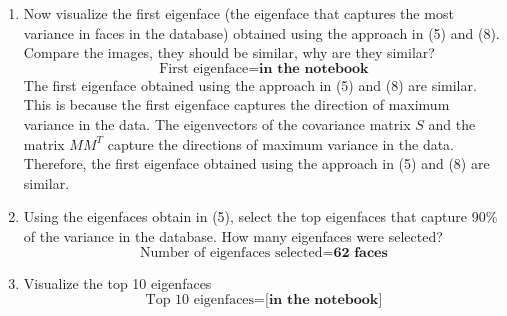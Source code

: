 \documentclass[12pt]{extarticle} %
\begin{document}
\begin{enumerate}
    \item Now visualize the first eigenface (the eigenface that captures the most variance in faces in the database) obtained using the approach in (5) and (8). Compare the images, they should be similar, why are they similar?
    \[
    \text{First eigenface} = \textbf{in the notebook}
    \]
    The first eigenface obtained using the approach in (5) and (8) are similar. This is because the first eigenface captures the direction of maximum variance in the data. The eigenvectors of the covariance matrix \(S\) and the matrix \(MM^T\) capture the directions of maximum variance in the data. Therefore, the first eigenface obtained using the approach in (5) and (8) are similar.
    \item Using the eigenfaces obtain in (5), select the top eigenfaces that capture 90\% of the variance in the database. How many eigenfaces were selected?
    \[
    \text{Number of eigenfaces selected} = \textbf{62 faces}
    \]
    \item Visualize the top 10 eigenfaces
    \[
    \text{Top 10 eigenfaces} = \textbf{[in the notebook]}
    \]
    

\end{enumerate}
\end{document}
